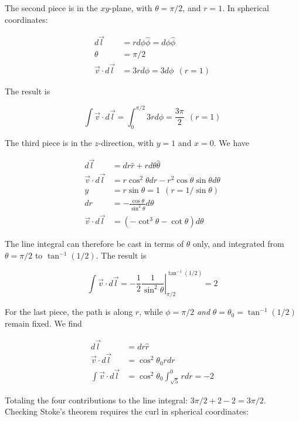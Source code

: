 \documentclass[10pt]{article}
\begin{document}
The second piece is in the $xy$-plane, with $\theta = \pi/2$, and $r = 1$.  In spherical coordinates:

\begin{align}
d\vec{l} &= r d\phi \hat{\phi} = d\phi \hat{\phi} \\
\theta &= \pi/2 \\
\vec{v} \cdot d\vec{l} &= 3 r d\phi = 3 d\phi ~~ (r = 1)
\end{align}

The result is

\begin{equation}
\int \vec{v} \cdot d\vec{l} = \int_{0}^{\pi/2} 3 r d\phi = \frac{3\pi}{2} ~~ (r = 1)
\end{equation}

The third piece is in the $z$-direction, with $y = 1$ and $x = 0$.  We have

\begin{align}
d\vec{l} &= dr \hat{r} + r d\theta \hat{\theta} \\
\vec{v} \cdot d\vec{l} &= r \cos^2\theta dr - r^2 \cos\theta\sin\theta d\theta \\
y &= r\sin\theta = 1 ~~ (r = 1/\sin\theta) \\
dr &= -\frac{\cos\theta}{\sin^2\theta} d\theta \\
\vec{v} \cdot d\vec{l} &= (-\cot^3\theta - \cot\theta) d\theta
\end{align}

The line integral can therefore be cast in terms of $\theta$ only, and integrated from $\theta = \pi/2$ to $\tan^{-1}(1/2)$.  The result is 

\begin{equation}
\int \vec{v} \cdot d\vec{l} = -\frac{1}{2} \left. \frac{1}{\sin^2\theta} \right|_{\pi/2}^{\tan^{-1}(1/2)} = 2
\end{equation}

For the last piece, the path is along $r$, while $\phi = \pi/2$ \textit{and} $\theta = \theta_0 = \tan^{-1}(1/2)$ remain fixed.  We find

\begin{align}
d\vec{l} &= dr \hat{r} \\
\vec{v} \cdot d\vec{l} &= \cos^2\theta_0 r dr \\
\int \vec{v} \cdot d\vec{l} &= \cos^2\theta_0 \int_{\sqrt{5}}^{0} r dr = -2
\end{align}

Totaling the four contributions to the line integral: $\boxed{3\pi/2 + 2 - 2 = 3\pi/2}$.  Checking Stoke's theorem requires the curl in spherical coordinates:
\end{document}
